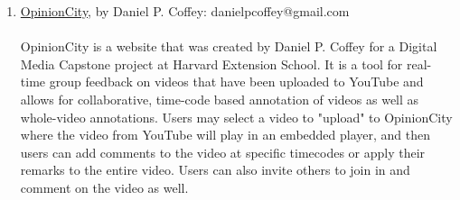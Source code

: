 \begin{enumerate}
\item \href{http://opinion.city}{OpinionCity}, by Daniel P. Coffey: danielpcoffey@gmail.com \\
\\ 
OpinionCity is a website that was created by Daniel P. Coffey for a Digital Media Capstone project at Harvard Extension School.  It is a tool for real-time group feedback on videos that have been uploaded to YouTube and allows for collaborative, time-code based annotation of videos as well as whole-video annotations.  Users may select a video to "upload" to OpinionCity where the video from YouTube will play in an embedded player, and then users can add comments to the video at specific timecodes or apply their remarks to the entire video.  Users can also invite others to join in and comment on the video as well. \\
\\






\end{enumerate}
